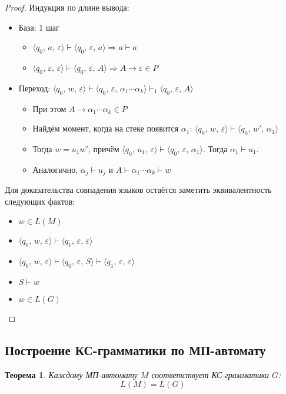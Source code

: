 \documentclass[a4paper,12pt]{article}
\theoremstyle{plain}
\newtheorem{theorem}{Теорема}[subsection]
\theoremstyle{definition}
\theoremstyle{remark}
\begin{document}
\begin{proof}
	Индукция по длине вывода:
	\begin{itemize}
		\item База: 1 шаг
		      \begin{itemize}
			      \item $\langle q_0,\, a,\, \varepsilon\rangle \vdash \langle q_0,\, \varepsilon,\, a\rangle \Rightarrow a \vdash a$
			      \item $\langle q_0,\, \varepsilon,\, \varepsilon\rangle\vdash\langle q_0,\, \varepsilon,\, A\rangle \Rightarrow A \to \varepsilon \in P$
		      \end{itemize}
		\item Переход: $\langle q_0,\, w,\, \varepsilon\rangle\vdash\langle q_0,\, \varepsilon,\, \alpha_1\cdots\alpha_k\rangle\vdash_1\langle q_0,\, \varepsilon,\, A\rangle$
		      \begin{itemize}
			      \item При этом $A \to \alpha_1\cdots\alpha_k \in P$
			      \item Найдём момент, когда на стеке появится $\alpha_1$: $\langle q_0,\, w,\, \varepsilon\rangle \vdash\langle q_0,\, w',\, \alpha_1\rangle$
			      \item Тогда $w = u_1w'$, причём $\langle q_0,\, u_1,\, \varepsilon\rangle \vdash\langle q_0,\, \varepsilon,\, \alpha_1\rangle$. Тогда $\alpha_1 \vdash u_1$.
			      \item Аналогично, $\alpha_j \vdash u_j$ и $A \vdash \alpha_1\cdots\alpha_k \vdash w$
		      \end{itemize}
	\end{itemize}
	Для доказательства совпадения языков остаётся заметить эквивалентность следующих фактов:
	\begin{itemize}
		\item $w \in L(M)$
		\item $\langle q_0,\,w,\, \varepsilon\rangle\vdash\langle q_1,\, \varepsilon,\, \varepsilon\rangle$
		\item $\langle q_0,\, w,\, \varepsilon\rangle \vdash \langle q_0,\, \varepsilon,\, S\rangle \vdash\langle q_1,\, \varepsilon,\, \varepsilon\rangle$
		\item $S \vdash w$
		\item $w \in L(G)$
	\end{itemize}
\end{proof}

\subsection{Построение КС-грамматики по МП-автомату}
\begin{theorem}
	Каждому МП-автомату $M$ соответствует КС-грамматика $G$:
	\[
		L(M) = L(G)
	\]
\end{theorem}
\end{document}
